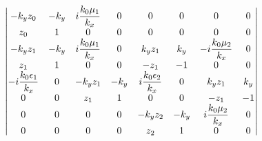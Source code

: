{\begin{itshape}
  \begin{align*}
  &{\,}
  \begin{vmatrix}
  -{k_y}z_0 &  -{k_y} & i\frac{k_0\mu_1}{k_x} & 0 & 0 & 0 & 0 & 0
  \\
  z_0 & 1 & 0 & 0 & 0 & 0 & 0 & 0
  \\
  -{k_y} z_1 & - {k_y} & i\frac{k_0\mu_1}{k_x} & 0 & k_y z_1 & k_y & -i\frac{k_0\mu_2}{k_x} & 0
  \\
  z_1 & 1 & 0 & 0 & -z_1 & -1 & 0 & 0
  \\
  -i\frac{k_0\eps_1}{k_x} & 0 & -k_y z_1 & - k_y & i\frac{k_0\eps_2}{k_x} & 0 & k_y z_1 & k_y
  \\
  0 & 0 & z_1 & 1 & 0 & 0 & -z_1 & -1
  \\
  0 & 0 & 0 & 0 & -k_y z_2 & -k_y & i\frac{k_0\mu_2}{k_x} & 0
  \\
  0 & 0 & 0 & 0 & z_2 & 1 & 0 & 0
  \end{vmatrix}

\end{align*}
\end{itshape}}
